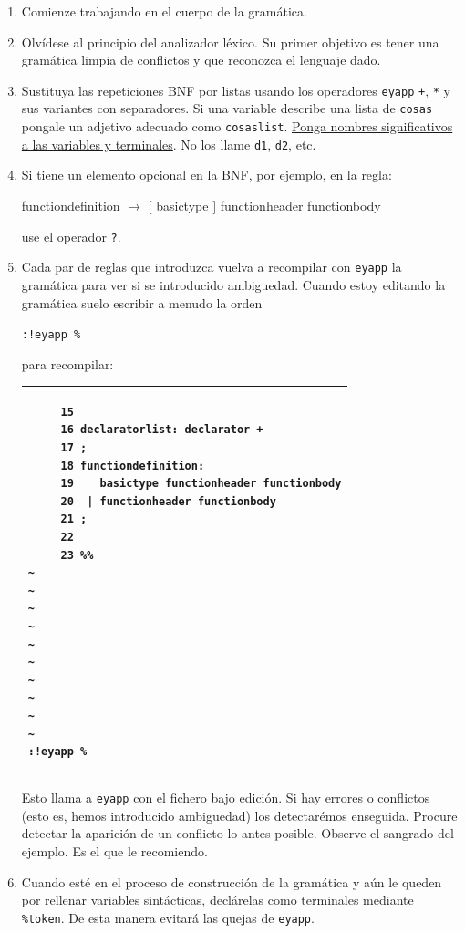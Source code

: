 \begin{enumerate}
\item
Comienze trabajando en el cuerpo de la gramática.
\item
Olvídese al principio del 
analizador léxico. Su primer objetivo es tener una gramática limpia
de conflictos y que reconozca el lenguaje dado. 
\item
Sustituya las repeticiones
BNF por listas usando los operadores \verb|eyapp| \verb|+|, \verb|*| y sus variantes con separadores. 
Si una variable describe una lista de \verb|cosas| pongale un adjetivo adecuado como
\verb|cosaslist|. 
\underline{Ponga nombres significativos a las variables y terminales}. 
No los llame \verb|d1|, \verb|d2|, etc.
\item
Si tiene un elemento opcional en la BNF, por ejemplo, en la regla: 

functiondefinition $\rightarrow$ $[$ basictype $]$ functionheader functionbody

use el operador \verb|?|.
\item
Cada par de reglas que introduzca vuelva a recompilar con \verb|eyapp| la gramática
para ver si se introducido ambiguedad. Cuando estoy editando la gramática
suelo escribir a menudo la orden 

\verb|:!eyapp %| 

para recompilar:

\vspace{0.5cm}
\begin{tabular}{|p{14.5cm}|}
\hline
\begin{verbatim}
     15
     16 declaratorlist: declarator +
     17 ;
     18 functiondefinition: 
     19    basictype functionheader functionbody
     20  | functionheader functionbody
     21 ;
     22
     23 %%
~
~
~
~
~
~
~
~
~
~
:!eyapp %
\end{verbatim}\\
\hline
\end{tabular}
\vspace{0.5cm}

Esto llama a \verb|eyapp| con el fichero bajo edición. Si hay errores o conflictos (esto es,
hemos introducido ambiguedad) los detectarémos enseguida.
Procure detectar la aparición de un conflicto lo antes posible.
Observe el sangrado del ejemplo. Es el que le recomiendo.
\item
Cuando esté en el proceso de construcción de la gramática y aún le queden
por rellenar variables sintácticas, declárelas como terminales mediante
\verb|%token|. De esta manera
evitará las quejas de \verb|eyapp|.


\end{enumerate}
